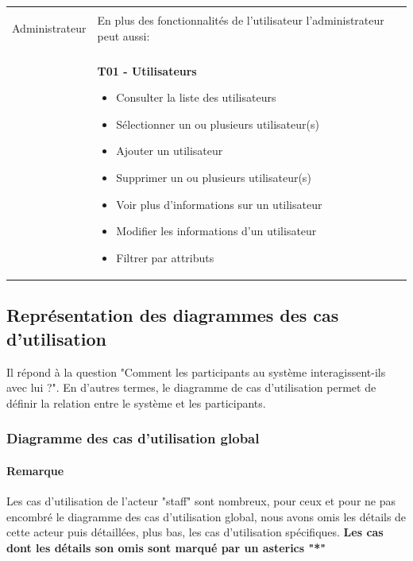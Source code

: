 \begin{longtable}{|Z{3cm}|L{10cm}|}
    \hline & \\ Administrateur & 
    En plus des fonctionnalités de l'utilisateur l'administrateur peut aussi:\\
    & \\ &
    \textbf{T01 - Utilisateurs}
    \begin{itemize}
        \item Consulter la liste des utilisateurs
        \item Sélectionner un ou plusieurs utilisateur(s)
        \item Ajouter un utilisateur
        \item Supprimer un ou plusieurs utilisateur(s)
        \item Voir plus d'informations sur un utilisateur
        \item Modifier les informations d'un utilisateur
        \item Filtrer par attributs
    \end{itemize}
\end{longtable}

\subsection{Représentation des diagrammes des cas d'utilisation}
Il répond à la question "Comment les participants au système interagissent-ils avec lui ?". En d'autres termes, le diagramme de cas d'utilisation permet de définir la relation entre le système et les participants.

\subsubsection{Diagramme des cas d’utilisation global}
\paragraph*{Remarque} Les cas d'utilisation de l'acteur "staff" sont nombreux, pour ceux et pour ne pas encombré le diagramme des cas d'utilisation global, nous avons omis les détails de cette acteur puis détaillées, plus bas, les cas d'utilisation spécifiques. \textbf{Les cas dont les détails son omis sont marqué par un asterics "*"}\\

